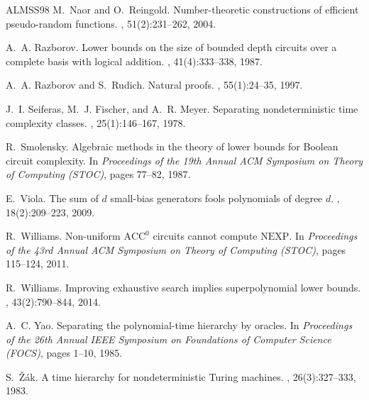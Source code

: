 \documentclass[11pt,letterpaper]{article}
\begin{document}
\begin{thebibliography}{ALMSS98}
M.~Naor and O.~Reingold.
\newblock Number-theoretic constructions of efficient pseudo-random functions.
, 51(2):231--262, 2004.

A.~A. Razborov.
\newblock Lower bounds on the size of bounded depth circuits over a complete basis with logical addition.
, 41(4):333--338, 1987.

A.~A. Razborov and S.~Rudich.
\newblock Natural proofs.
, 55(1):24--35, 1997.

J.~I. Seiferas, M.~J. Fischer, and A.~R. Meyer.
\newblock Separating nondeterministic time complexity classes.
, 25(1):146--167, 1978.

R.~Smolensky.
\newblock Algebraic methods in the theory of lower bounds for {B}oolean circuit complexity.
\newblock In {\em Proceedings of the 19th Annual ACM Symposium on Theory of Computing (STOC)}, pages 77--82, 1987.

E.~Viola.
\newblock The sum of $d$ small-bias generators fools polynomials of degree $d$.
, 18(2):209--223, 2009.

R.~Williams.
\newblock Non-uniform $\mathrm{ACC}^0$ circuits cannot compute $\mathrm{NEXP}$.
\newblock In {\em Proceedings of the 43rd Annual ACM Symposium on Theory of Computing (STOC)}, pages 115--124, 2011.

R.~Williams.
\newblock Improving exhaustive search implies superpolynomial lower bounds.
, 43(2):790--844, 2014.

A.~C. Yao.
\newblock Separating the polynomial-time hierarchy by oracles.
\newblock In {\em Proceedings of the 26th Annual IEEE Symposium on Foundations of Computer Science (FOCS)}, pages 1--10, 1985.

S.~{\v{Z}}{\'a}k.
\newblock A time hierarchy for nondeterministic {T}uring machines.
, 26(3):327--333, 1983.

\end{thebibliography}
\end{document}
